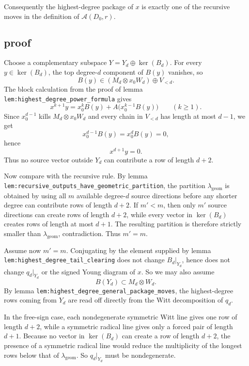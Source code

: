 \documentclass[
]{article}
\begin{document}
Consequently the highest-degree package of \(x\) is exactly one of the
recursive moves in the definition of \(\mathcal A(D_0,r)\).

\subsection{proof}\label{proof-23}

Choose a complementary subspace \(Y=Y_d\oplus \ker(B_d)\). For every
\(y\in \ker(B_d)\), the top degree-\(d\) component of \(B(y)\) vanishes,
so \[
B(y)\in (M_d\otimes x_0W_d)\oplus V_{<d}.
\] The block calculation from the proof of lemma
\texttt{lem:highest\_degree\_power\_formula} gives \[
x^{k+1}y=x_0^kB(y)+A\!\bigl(x_0^{k-1}B(y)\bigr)
\qquad(k\ge 1).
\] Since \(x_0^{d-1}\) kills \(M_d\otimes x_0W_d\) and every chain in
\(V_{<d}\) has length at most \(d-1\), we get \[
x_0^{d-1}B(y)=x_0^dB(y)=0,
\] hence \[
x^{d+1}y=0.
\] Thus no source vector outside \(Y_d\) can contribute a row of length
\(d+2\).

Now compare with the recursive rule. By lemma
\texttt{lem:recursive\_outputs\_have\_geometric\_partition}, the
partition \(\lambda_{\mathrm{geom}}\) is obtained by using all \(m\)
available degree-\(d\) source directions before any shorter degree can
contribute rows of length \(d+2\). If \(m'<m\), then only \(m'\) source
directions can create rows of length \(d+2\), while every vector in
\(\ker(B_d)\) creates rows of length at most \(d+1\). The resulting
partition is therefore strictly smaller than
\(\lambda_{\mathrm{geom}}\), contradiction. Thus \(m'=m\).

Assume now \(m'=m\). Conjugating by the element supplied by lemma
\texttt{lem:highest\_degree\_tail\_clearing} does not change
\(B_d|_{Y_d}\), hence does not change \(q_d|_{Y_d}\) or the signed Young
diagram of \(x\). So we may also assume \[
B(Y_d)\subset M_d\otimes W_d.
\] By lemma \texttt{lem:highest\_degree\_general\_package\_moves}, the
highest-degree rows coming from \(Y_d\) are read off directly from the
Witt decomposition of \(q_d\).

In the free-sign case, each nondegenerate symmetric Witt line gives one
row of length \(d+2\), while a symmetric radical line gives only a
forced pair of length \(d+1\). Because no vector in \(\ker(B_d)\) can
create a row of length \(d+2\), the presence of a symmetric radical line
would reduce the multiplicity of the longest rows below that of
\(\lambda_{\mathrm{geom}}\). So \(q_d|_{Y_d}\) must be nondegenerate.
\end{document}
